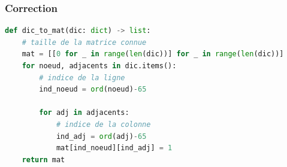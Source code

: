 \documentclass[svgnames,11pt]{beamer}
\begin{document}
\begin{frame}[fragile]
    \frametitle{Correction}

\begin{center}
\begin{lstlisting}[language=Python , basicstyle=\ttfamily\small, xleftmargin=2em, xrightmargin=2em]
def dic_to_mat(dic: dict) -> list:
    # taille de la matrice connue
    mat = [[0 for _ in range(len(dic))] for _ in range(len(dic))]
    for noeud, adjacents in dic.items():
        # indice de la ligne
        ind_noeud = ord(noeud)-65

        for adj in adjacents:
            # indice de la colonne
            ind_adj = ord(adj)-65
            mat[ind_noeud][ind_adj] = 1
    return mat
\end{lstlisting}
\end{center}

\end{frame}
\end{document}
